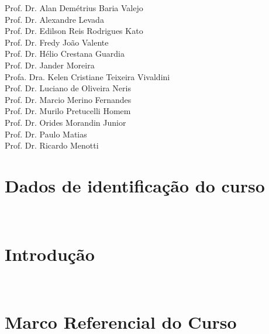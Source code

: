 \documentclass[11pt,a4paper]{report}
\begin{document}
\begin{center}
    Prof. Dr. Alan Demétrius Baria Valejo\\
    Prof. Dr. Alexandre Levada\\
    Prof. Dr. Edilson Reis Rodrigues Kato\\
    Prof. Dr. Fredy João Valente\\
    Prof. Dr. Hélio Crestana Guardia\\
    Prof. Dr. Jander Moreira\\
    Profa. Dra. Kelen Cristiane Teixeira Vivaldini\\
    Prof. Dr. Luciano de Oliveira Neris\\
    Prof. Dr. Marcio Merino Fernandes\\
    Prof. Dr. Murilo Pretucelli Homem \\
    Prof. Dr. Orides Morandin Junior\\
    Prof. Dr. Paulo Matias\\
    Prof. Dr. Ricardo Menotti\\

    \vspace{1.5ex}

\end{center}


\clearpage


\chapter*{Dados de identificação do curso}~\label{cha:dados}


\singlespacing
\tableofcontents
\listoffigures
\listoftables

\doublespacing


\chapter{Introdução}~\label{cha:intro}


\chapter{Marco Referencial do Curso}~\label{cha:MarcoReferencial}

\end{document}
